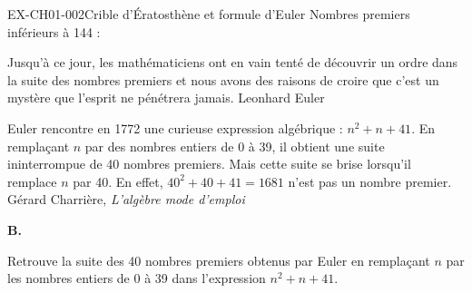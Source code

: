 \begin{exercice}{EX-CH01-002}{Crible d'Ératosthène et formule d'Euler}
\vspace{20pt}
Nombres premiers inférieurs à 144 : 

\vspace{20pt}
{\footnotesize \og Jusqu'à ce jour, les mathématiciens ont en vain tenté de découvrir un ordre dans la suite des nombres premiers et nous avons des raisons de croire que c'est un mystère que l'esprit ne pénétrera jamais. \fg \hfill Leonhard Euler}

\medskip
{\footnotesize \og Euler rencontre en 1772 une curieuse expression algébrique : $n^2 + n + 41$. En remplaçant $n$ par des nombres entiers de 0 à 39, il obtient une suite ininterrompue de 40 nombres premiers. Mais cette suite se brise lorsqu'il remplace $n$ par 40. En effet, $40^2 + 40 + 41 = 1681$ n'est pas un nombre premier. \fg \hfill Gérard Charrière, \textit{L'algèbre mode d'emploi}}

\newpage
\textbf{B.}

\medskip
Retrouve la suite des 40 nombres premiers obtenus par Euler en remplaçant $n$ par les nombres entiers de 0 à 39 dans l'expression $n^2 + n + 41$.


\end{exercice}
